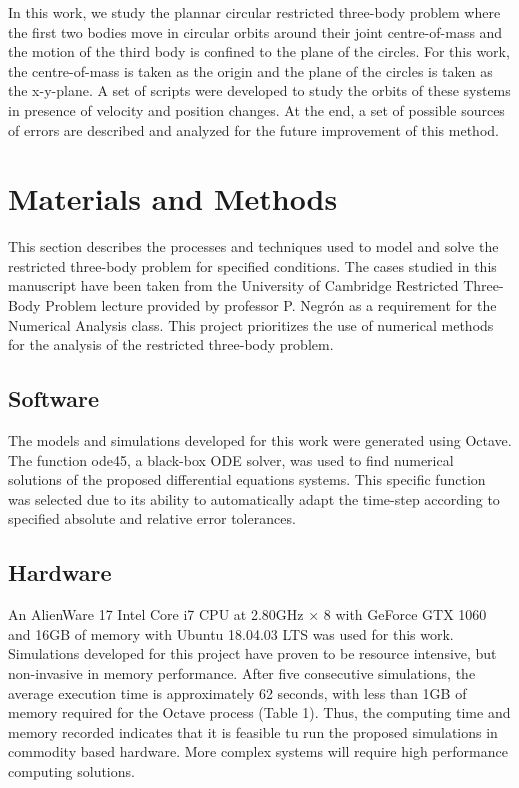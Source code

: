 \documentclass{article}
\begin{document}
In this work, we study the plannar circular restricted three-body problem where the first two bodies move in circular orbits around their joint centre-of-mass and the motion of the third body is confined to the plane of the circles. For this work, the centre-of-mass is taken as the origin and the plane of the circles is taken as the x-y-plane. A set of scripts were developed to study the orbits of these systems in presence of velocity and position changes. At the end, a set of possible sources of errors are described and analyzed for the future improvement of this method.

\section{Materials and Methods}

This section describes the processes and techniques used to model and solve the restricted three-body problem for specified conditions. The cases studied in this manuscript have been taken from the University of Cambridge Restricted Three-Body Problem lecture provided by professor P. Negr\'{o}n as a requirement for the Numerical Analysis class. This project prioritizes the use of numerical methods for the analysis of the restricted three-body problem.
 
\subsection{Software}

The models and simulations developed for this work were generated using Octave. The function ode45, a black-box ODE solver, was used to find numerical solutions of the proposed differential equations systems. This specific function was selected due to its ability to automatically adapt the time-step according to specified absolute and relative error tolerances. 

\subsection{Hardware}

An AlienWare 17 Intel Core i7 CPU at 2.80GHz × 8 with GeForce GTX 1060 and 16GB of memory with Ubuntu 18.04.03 LTS was used for this work. Simulations developed for this project have proven to be resource intensive, but non-invasive in memory performance. After five consecutive simulations, the average execution time is approximately 62 seconds, with less than 1GB of memory required for the Octave process (Table 1). Thus, the computing time and memory recorded indicates that it is feasible tu run the proposed simulations in commodity based hardware. More complex systems will require high performance computing solutions.
\end{document}
